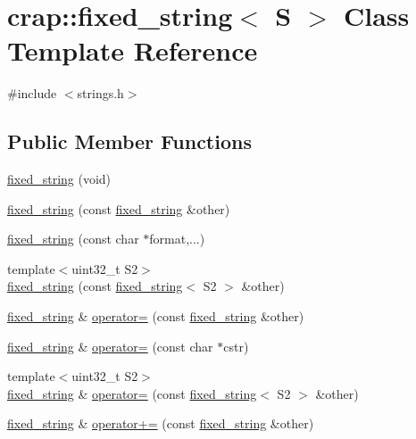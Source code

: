 \hypertarget{classcrap_1_1fixed__string}{}\section{crap\+:\+:fixed\+\_\+string$<$ S $>$ Class Template Reference}
\label{classcrap_1_1fixed__string}


{\ttfamily \#include $<$strings.\+h$>$}

\subsection*{Public Member Functions}
\begin{DoxyCompactItemize}
\item 
\hyperlink{classcrap_1_1fixed__string_a44a0a2c1ac4b3d7f1cb4895efd736131}{fixed\+\_\+string} (void)
\item 
\hyperlink{classcrap_1_1fixed__string_ae897948db4d98769407a569d3a96b667}{fixed\+\_\+string} (const \hyperlink{classcrap_1_1fixed__string}{fixed\+\_\+string} \&other)
\item 
\hyperlink{classcrap_1_1fixed__string_ad95887a514af9238c02f1864ece86ffa}{fixed\+\_\+string} (const char $\ast$format,...)
\item 
{\footnotesize template$<$uint32\+\_\+t S2$>$ }\\\hyperlink{classcrap_1_1fixed__string_a2f1a4f79c8c81c4987e37b6dc22ea640}{fixed\+\_\+string} (const \hyperlink{classcrap_1_1fixed__string}{fixed\+\_\+string}$<$ S2 $>$ \&other)
\item 
\hyperlink{classcrap_1_1fixed__string}{fixed\+\_\+string} \& \hyperlink{classcrap_1_1fixed__string_acd5df9be5c467dc00c15964ce31732f2}{operator=} (const \hyperlink{classcrap_1_1fixed__string}{fixed\+\_\+string} \&other)
\item 
\hyperlink{classcrap_1_1fixed__string}{fixed\+\_\+string} \& \hyperlink{classcrap_1_1fixed__string_a1d95da4520ec9288b9dbf4093c24d53e}{operator=} (const char $\ast$cstr)
\item 
{\footnotesize template$<$uint32\+\_\+t S2$>$ }\\\hyperlink{classcrap_1_1fixed__string}{fixed\+\_\+string} \& \hyperlink{classcrap_1_1fixed__string_a5d8738a020eed1e5516a333f02a1a002}{operator=} (const \hyperlink{classcrap_1_1fixed__string}{fixed\+\_\+string}$<$ S2 $>$ \&other)
\item 
\hyperlink{classcrap_1_1fixed__string}{fixed\+\_\+string} \& \hyperlink{classcrap_1_1fixed__string_a9aa94a9b0747c6667aaa2a28aa917f6c}{operator+=} (const \hyperlink{classcrap_1_1fixed__string}{fixed\+\_\+string} \&other)

\end{DoxyCompactItemize}

